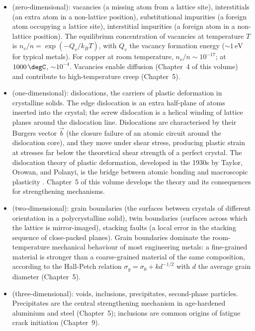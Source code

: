 \begin{itemize}[leftmargin=*]
\item {} (zero-dimensional): vacancies (a missing
  atom from a lattice site), interstitials (an extra atom in a
  non-lattice position), substitutional impurities (a foreign atom
  occupying a lattice site), interstitial impurities (a foreign atom
  in a non-lattice position). The equilibrium concentration of
  vacancies at temperature $T$ is $n_v/n = \exp(-Q_v/k_B T)$, with
  $Q_v$ the vacancy formation energy ($\sim 1\,\text{eV}$ for typical
  metals). For copper at room temperature, $n_v/n \sim 10^{-17}$; at
  $1000\,\degC$, $\sim 10^{-4}$. Vacancies enable diffusion
  (Chapter~4 of this volume) and contribute to high-temperature creep
  (Chapter~5).
\item {} (one-dimensional): dislocations, the
  carriers of plastic deformation in crystalline solids. The edge
  dislocation is an extra half-plane of atoms inserted into the
  crystal; the screw dislocation is a helical winding of lattice
  planes around the dislocation line. Dislocations are characterised
  by their Burgers vector $\vec{b}$ (the closure failure of an atomic
  circuit around the dislocation core), and they move under shear
  stress, producing plastic strain at stresses far below the
  theoretical shear strength of a perfect crystal. The dislocation
  theory of plastic deformation, developed in the 1930s by Taylor,
  Orowan, and Polanyi, is the bridge between atomic bonding and
  macroscopic plasticity \cite[ch.~6]{text:smallman-physical-metallurgy}.
  Chapter~5 of this volume develops the theory and its consequences
  for strengthening mechanisms.
\item {} (two-dimensional): grain boundaries
  (the surfaces between crystals of different orientation in a
  polycrystalline solid), twin boundaries (surfaces across which the
  lattice is mirror-imaged), stacking faults (a local error in the
  stacking sequence of close-packed planes). Grain boundaries dominate
  the room-temperature mechanical behaviour of most engineering
  metals: a fine-grained material is stronger than a coarse-grained
  material of the same composition, according to the Hall-Petch
  relation $\sigma_y = \sigma_0 + k d^{-1/2}$ with $d$ the average
  grain diameter (Chapter~5).
\item {} (three-dimensional): voids, inclusions,
  precipitates, second-phase particles. Precipitates are the central
  strengthening mechanism in age-hardened aluminium and steel
  (Chapter~5); inclusions are common origins of fatigue crack
  initiation (Chapter~9).
\end{itemize}

